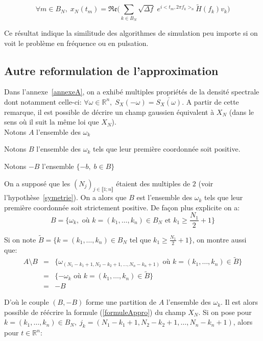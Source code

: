 \begin{equation*} \forall m \in B_N, \; x_N(t_m) = \mathfrak{Re}\biggl(\displaystyle\sum_{k \in B_N} \sqrt{\Delta f} \; e^{i<t_m,2\pi f_k>_{n}}\tilde{H}(f_k)v_k \biggl) \end{equation*}


\noindent Ce résultat indique la similitude des algorithmes de simulation peu importe si on voit le problème en fréquence ou en pulsation.


\subsection{Autre reformulation de l'approximation}

Dans l'annexe~\ref{annexeA}, on a exhibé multiples propriétés de la densité spectrale dont notamment celle-ci: $\forall \omega \in \mathbb{R}^n, \; S_X(-\omega) = \overline{S_X(\omega)}$. A partir de cette remarque, il est possible de décrire
un champ gaussien équivalent à $X_N$ (dans le sens où il suit la même loi que $X_N$).\\

\noindent Notons $A$ l'ensemble des $\omega_k$

\noindent Notons $B$ l'ensemble des $\omega_k$ tels que leur première coordonnée soit positive.

\noindent Notons $-B$ l'ensemble $\{ -b,\; b \in B\}$

\noindent On a supposé que les $(N_j)_{j \in \llbracket 1;n\rrbracket}$ étaient des multiples de $2$ (voir l'hypothèse~\ref{symetrie}). On a alors que $B$ est l'ensemble des $\omega_k$ tels que leur première coordonnée soit strictement positive. De façon plus explicite on a:
\begin{equation}
B = \{ \omega_k, \text{ où } k = (k_1, \dots, k_n) \in B_N \text{ et } k_1 \geq \frac{N_1}{2} + 1 \}
\end{equation}

\noindent Si on note  $\tilde{B} = \{ k = (k_1, \dots, k_n) \in B_N $ tel que $ k_1 \geq \frac{N_1}{2} + 1 \} $, on montre aussi que:
\begin{eqnarray*}
  A \setminus B &=& \{ \omega_{(N_1-k_1+1, N_2-k_2+1, \dots, N_n-k_n+1)} \text{ où } k = (k_1, \dots, k_n) \in \tilde{B} \}\\
  &=& \{ -\omega_k \text{ où } k = (k_1, \dots, k_n) \in \tilde{B} \}\\
  &=& -B
\end{eqnarray*}

\newpage
D'où le couple $(B,-B)$ forme une partition de $A$ l'ensemble des $\omega_k$. Il
est alors possible de réécrire la formule (\ref{formuleAppro}) du champ $X_N$. Si on pose pour $k = (k_1, \dots, k_n) \in B_N, \; j_k = (N_1-k_1+1, N_2-k_2+1, \dots, N_n-k_n+1)$,
alors pour $t \in \mathbb{R}^n$:


